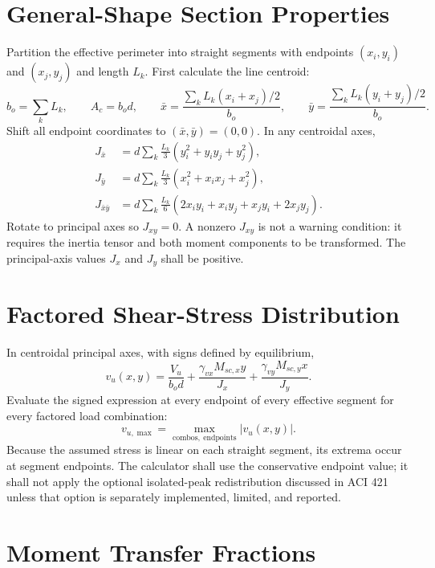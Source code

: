 \documentclass[10pt]{article}
\begin{document}
\section{General-Shape Section Properties}

Partition the effective perimeter into straight segments with endpoints
$(x_i,y_i)$ and $(x_j,y_j)$ and length $L_k$. First calculate the line centroid:
\begin{equation}
b_o=\sum_k L_k,\qquad A_c=b_od,\qquad
\bar x=\frac{\sum_k L_k(x_i+x_j)/2}{b_o},\qquad
\bar y=\frac{\sum_k L_k(y_i+y_j)/2}{b_o}.
\end{equation}
Shift all endpoint coordinates to $(\bar x,\bar y)=(0,0)$. In any centroidal
axes,
\begin{align}
J_{\bar x}&=d\sum_k\frac{L_k}{3}
  \left(y_i^2+y_iy_j+y_j^2\right),\\
J_{\bar y}&=d\sum_k\frac{L_k}{3}
  \left(x_i^2+x_ix_j+x_j^2\right),\\
J_{\bar x\bar y}&=d\sum_k\frac{L_k}{6}
  \left(2x_iy_i+x_iy_j+x_jy_i+2x_jy_j\right).
\end{align}
Rotate to principal axes so $J_{xy}=0$. A nonzero $J_{xy}$ is not a warning
condition: it requires the inertia tensor and both moment components to be
transformed. The principal-axis values $J_x$ and $J_y$ shall be positive.

\section{Factored Shear-Stress Distribution}

In centroidal principal axes, with signs defined by equilibrium,
\begin{equation}
v_u(x,y)=\frac{V_u}{b_od}
 +\frac{\gamma_{vx}M_{sc,x}y}{J_x}
 +\frac{\gamma_{vy}M_{sc,y}x}{J_y}.
\end{equation}
Evaluate the signed expression at every endpoint of every effective segment for
every factored load combination:
\begin{equation}
v_{u,\max}=\max_{\mathrm{combos,\ endpoints}}\left|v_u(x,y)\right|.
\end{equation}
Because the assumed stress is linear on each straight segment, its extrema occur
at segment endpoints. The calculator shall use the conservative endpoint value;
it shall not apply the optional isolated-peak redistribution discussed in ACI
421 unless that option is separately implemented, limited, and reported.

\section{Moment Transfer Fractions}
\end{document}
